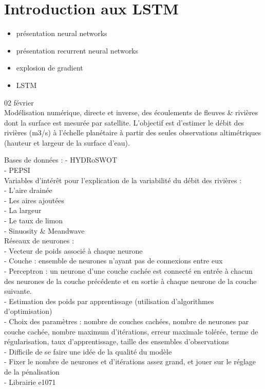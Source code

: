 \section{Introduction aux LSTM}

\begin{itemize}
    \item présentation neural networks
    \item présentation recurrent neural networks
    \item explosion de gradient 
    \item LSTM \\
\end{itemize}


02 février\\

Modélisation numérique, directe et inverse, des écoulements de fleuves & rivières dont la surface est mesurée par satellite. L'objectif est d’estimer le débit des rivières (m3/s) à l'échelle planétaire à partir des seules observations altimétriques (hauteur et largeur de la surface d'eau).\newline

Bases de données :\newline
-	HYDRoSWOT\\
-	PEPSI\\

Variables d’intérêt pour l’explication de la variabilité du débit des rivières :\\
-	L’aire drainée\\
-	Les aires ajoutées\\
-	La largeur\\
-	Le taux de limon\\
-	Sinuosity & Meandwave\\

Réseaux de neurones :\\
-	Vecteur de poids associé à chaque neurone\\
-	Couche : ensemble de neurones n’ayant pas de connexions entre eux\\
-	Perceptron : un neurone d’une couche cachée est connecté en entrée à chacun des neurones de la couche précédente et en sortie à chaque neurone de la couche suivante.\\
-	Estimation des poids par apprentissage (utilisation d’algorithmes d’optimisation)\\
-	Choix des paramètres : nombre de couches cachées, nombre de neurones par couche cachée, nombre maximum d’itérations, erreur maximale tolérée, terme de régularisation, taux d’apprentissage, taille des ensembles d’observations\\
-	Difficile de se faire une idée de la qualité du modèle\\
-	Fixer le nombre de neurones et d’itérations assez grand, et jouer sur le réglage de la pénalisation\\
-	Librairie e1071\\

